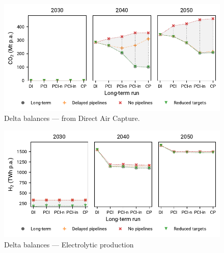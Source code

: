 \documentclass[preprint,12pt,sort&compress]{elsarticle}
\begin{document}
\begin{figure}[htbp]
  \centering
  \includegraphics[width=\textwidth]{delta_balances_DAC}
  \caption{Delta balances ---  from Direct Air Capture.}
  \label{fig:delta_balances_dac}
\end{figure}

\begin{figure}[htbp]
  \centering
  \includegraphics[width=\textwidth]{delta_balances_H2 Electrolysis}
  \caption{Delta balances --- Electrolytic  production}
  \label{fig:delta_balances_h2_electrolysis}
\end{figure}
\end{document}
